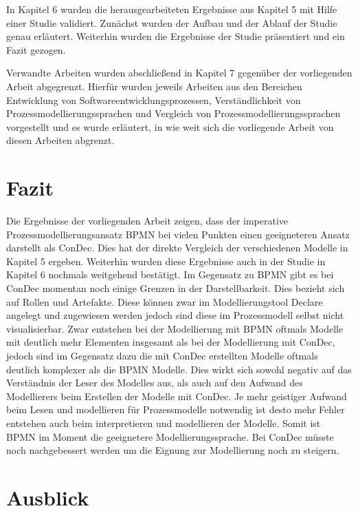 In Kapitel 6 wurden die herausgearbeiteten Ergebnisse aus Kapitel 5 mit Hilfe einer Studie validiert. Zunächst wurden der Aufbau und der Ablauf der Studie genau erläutert. Weiterhin wurden die Ergebnisse der Studie präsentiert und ein Fazit gezogen. \newline

Verwandte Arbeiten wurden abschließend in Kapitel 7 gegenüber der vorliegenden Arbeit abgegrenzt. Hierfür wurden jeweils Arbeiten aus den Bereichen Entwicklung von Softwareentwicklungsprozessen, Verständlichkeit von Prozessmodellierungssprachen und Vergleich von Prozessmodellierungssprachen vorgestellt und es wurde erläutert, in wie weit sich die vorliegende Arbeit von diesen Arbeiten abgrenzt.

\section{Fazit}

Die Ergebnisse der vorliegenden Arbeit zeigen, dass der imperative Prozessmodellierungsansatz BPMN bei vielen Punkten einen geeigneteren Ansatz darstellt als ConDec. Dies hat der direkte Vergleich der verschiedenen Modelle in Kapitel 5 ergeben. Weiterhin wurden diese Ergebnisse auch in der Studie in Kapitel 6 nochmals weitgehend bestätigt.\newline
Im Gegensatz zu BPMN gibt es bei ConDec momentan noch einige Grenzen in der Darstellbarkeit. Dies bezieht sich auf Rollen und Artefakte. Diese können zwar im Modellierungstool Declare angelegt und zugewiesen werden jedoch sind diese im Prozessmodell selbst nicht visualisierbar.\newline
Zwar entstehen bei der Modellierung mit BPMN oftmals Modelle mit deutlich mehr Elementen insgesamt als bei der Modellierung mit ConDec, jedoch sind im Gegensatz dazu die mit ConDec erstellten Modelle oftmals deutlich komplexer als die BPMN Modelle. Dies wirkt sich sowohl negativ auf das Verständnis der Leser des Modelles aus, als auch auf den Aufwand des Modellierers beim Erstellen der Modelle mit ConDec. Je mehr geistiger Aufwand beim Lesen und modellieren für Prozessmodelle notwendig ist desto mehr Fehler entstehen auch beim interpretieren und modellieren der Modelle.\newline
Somit ist BPMN im Moment die geeignetere Modellierungssprache. Bei ConDec müsste noch nachgebessert werden um die Eignung zur Modellierung noch zu steigern.\newline


\section{Ausblick}

